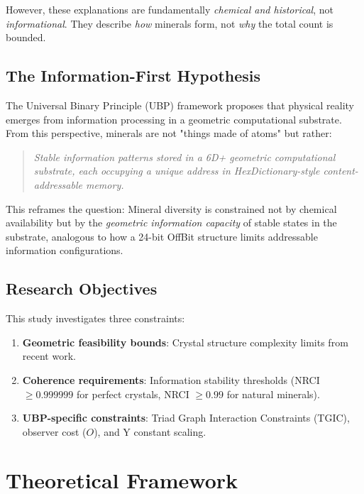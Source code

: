 \documentclass[11pt,a4paper]{article}
\begin{document}
However, these explanations are fundamentally \textit{chemical and historical}, not \textit{informational}. They describe \textit{how} minerals form, not \textit{why} the total count is bounded.

\subsection{The Information-First Hypothesis}

The Universal Binary Principle (UBP) framework\cite{ubp34manual} proposes that physical reality emerges from information processing in a geometric computational substrate. From this perspective, minerals are not "things made of atoms" but rather:

\begin{quote}
\textit{Stable information patterns stored in a 6D+ geometric computational substrate, each occupying a unique address in HexDictionary-style content-addressable memory.}
\end{quote}

This reframes the question: Mineral diversity is constrained not by chemical availability but by the \textit{geometric information capacity} of stable states in the substrate, analogous to how a 24-bit OffBit structure limits addressable information configurations.

\subsection{Research Objectives}

This study investigates three constraints:

\begin{enumerate}
\item \textbf{Geometric feasibility bounds}: Crystal structure complexity limits from recent work\cite{tschauner2024}.
\item \textbf{Coherence requirements}: Information stability thresholds (NRCI $\geq 0.999999$ for perfect crystals, NRCI $\geq 0.99$ for natural minerals).
\item \textbf{UBP-specific constraints}: Triad Graph Interaction Constraints (TGIC), observer cost ($O$), and Y constant scaling.
\end{enumerate}

\section{Theoretical Framework}
\end{document}
